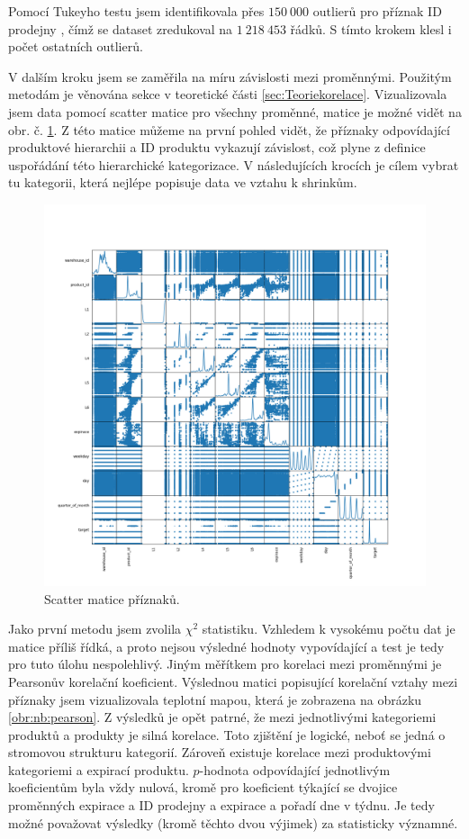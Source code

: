 Pomocí Tukeyho testu jsem identifikovala přes $150\ 000$ outlierů pro příznak ID prodejny %
, čímž se dataset zredukoval na $1\ 218\ 453$ řádků. S tímto krokem klesl i počet ostatních outlierů.

V dalším kroku jsem se zaměřila na míru závislosti mezi proměnnými. Použitým metodám je věnována sekce v teoretické části \ref{sec:Teoriekorelace}. Vizualizovala jsem data pomocí scatter matice pro všechny proměnné, matice je možné vidět na obr. č. \ref*{obr:nb:scatter}. Z této matice můžeme na první pohled vidět, že příznaky odpovídající produktové hierarchii a ID produktu vykazují závislost, což plyne z definice uspořádání této hierarchické kategorizace. V následujících krocích je cílem vybrat tu kategorii, která nejlépe popisuje data ve vztahu k shrinkům.

\begin{figure}[h!]
    \centering
    \includegraphics[width=.8\textwidth]{obrazky/zntb/MyScatter.png}
    \caption{Scatter matice příznaků.}
    \label{obr:nb:scatter}
\end{figure}
 
Jako první metodu jsem zvolila  $\chi^2$ statistiku. Vzhledem k vysokému počtu dat je matice příliš řídká, a proto nejsou výsledné hodnoty vypovídající a test je tedy pro tuto úlohu nespolehlivý.
Jiným měřítkem pro korelaci mezi proměnnými je Pearsonův korelační koeficient. %
Výslednou matici popisující korelační vztahy mezi příznaky jsem vizualizovala teplotní mapou, která je zobrazena na obrázku \ref*{obr:nb:pearson}. Z výsledků je opět patrné, že mezi jednotlivými kategoriemi produktů a produkty je silná korelace. Toto zjištění je logické, neboť se jedná o stromovou strukturu kategorií. Zároveň existuje korelace mezi produktovými kategoriemi a expirací produktu. $p$-hodnota odpovídající jednotlivým koeficientům byla vždy nulová, kromě pro koeficient týkající se dvojice proměnných expirace a ID prodejny a expirace a pořadí dne v týdnu. Je tedy možné považovat výsledky (kromě těchto dvou výjimek) za statisticky významné.

